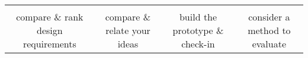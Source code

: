 {\begin{longtable}[]{cccc}
\begin{minipage}[t]{0.24\columnwidth}
\strut
\end{minipage}\tabularnewline
\begin{minipage}[t]{0.21\columnwidth}\raggedright\strut
compare \& rank design requirements\strut
\end{minipage} & \begin{minipage}[t]{0.21\columnwidth}\raggedright\strut
compare \& relate your ideas\strut
\end{minipage} & \begin{minipage}[t]{0.21\columnwidth}\raggedright\strut
build the prototype \& check-in\strut
\end{minipage} & \begin{minipage}[t]{0.21\columnwidth}\raggedright\strut
consider a method to evaluate\strut
\end{minipage}\tabularnewline
\bottomrule
\end{longtable}
\newpage
}
